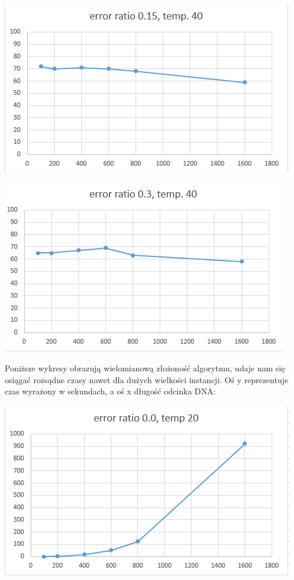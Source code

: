 \documentclass{article}
\begin{document}
\includegraphics{temp40err015}

\includegraphics{temp40err030}

Poniższe wykresy obrazują wielomianową złożoność algorytmu, udaje nam się osiągać rozsądne czasy nawet dla dużych wielkości instancji. Oś y reprezentuje czas wyrażony w sekundach, a oś x długość odcinka DNA:

\includegraphics{temp20err000time}
\end{document}
